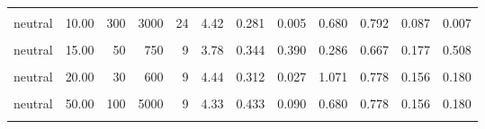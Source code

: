 \documentclass[
]{article}
\begin{document}
\begin{longtable}[t]{lrrrrrrlrrrl}
\hspace{1em}\cellcolor{gray!10}{neutral} & \cellcolor{gray!10}{10.00} & \cellcolor{gray!10}{40} & \cellcolor{gray!10}{400} & \cellcolor{gray!10}{9} & \cellcolor{gray!10}{4.33} & \cellcolor{gray!10}{0.395} & \cellcolor{gray!10}{0.062} & \cellcolor{gray!10}{0.745} & \cellcolor{gray!10}{0.889} & \cellcolor{gray!10}{0.118} & \cellcolor{gray!10}{0.039}\\
\hspace{1em}neutral & 10.00 & 300 & 3000 & 24 & 4.42 & 0.281 & 0.005 & 0.680 & 0.792 & 0.087 & 0.007\\
\hspace{1em}\cellcolor{gray!10}{neutral} & \cellcolor{gray!10}{15.00} & \cellcolor{gray!10}{20} & \cellcolor{gray!10}{300} & \cellcolor{gray!10}{24} & \cellcolor{gray!10}{4.46} & \cellcolor{gray!10}{0.253} & \cellcolor{gray!10}{0.001} & \cellcolor{gray!10}{0.789} & \cellcolor{gray!10}{0.833} & \cellcolor{gray!10}{0.079} & \cellcolor{gray!10}{0.002}\\
\hspace{1em}neutral & 15.00 & 50 & 750 & 9 & 3.78 & 0.344 & 0.390 & 0.286 & 0.667 & 0.177 & 0.508\\
\hspace{1em}\cellcolor{gray!10}{neutral} & \cellcolor{gray!10}{20.00} & \cellcolor{gray!10}{10} & \cellcolor{gray!10}{200} & \cellcolor{gray!10}{24} & \cellcolor{gray!10}{4.04} & \cellcolor{gray!10}{0.328} & \cellcolor{gray!10}{0.108} & \cellcolor{gray!10}{0.344} & \cellcolor{gray!10}{0.625} & \cellcolor{gray!10}{0.103} & \cellcolor{gray!10}{0.307}\\
\hspace{1em}neutral & 20.00 & 30 & 600 & 9 & 4.44 & 0.312 & 0.027 & 1.071 & 0.778 & 0.156 & 0.180\\
\hspace{1em}\cellcolor{gray!10}{neutral} & \cellcolor{gray!10}{50.00} & \cellcolor{gray!10}{10} & \cellcolor{gray!10}{500} & \cellcolor{gray!10}{24} & \cellcolor{gray!10}{4.62} & \cellcolor{gray!10}{0.260} & \cellcolor{gray!10}{<0.001} & \cellcolor{gray!10}{0.904} & \cellcolor{gray!10}{0.833} & \cellcolor{gray!10}{0.079} & \cellcolor{gray!10}{0.002}\\
\hspace{1em}neutral & 50.00 & 100 & 5000 & 9 & 4.33 & 0.433 & 0.090 & 0.680 & 0.778 & 0.156 & 0.180\\
\hspace{1em}\cellcolor{gray!10}{neutral} & \cellcolor{gray!10}{100.00} & \cellcolor{gray!10}{30} & \cellcolor{gray!10}{3000} & \cellcolor{gray!10}{24} & \cellcolor{gray!10}{4.50} & \cellcolor{gray!10}{0.301} & \cellcolor{gray!10}{0.004} & \cellcolor{gray!10}{0.692} & \cellcolor{gray!10}{0.833} & \cellcolor{gray!10}{0.079} & \cellcolor{gray!10}{0.002}\\

\end{longtable}
\end{document}

